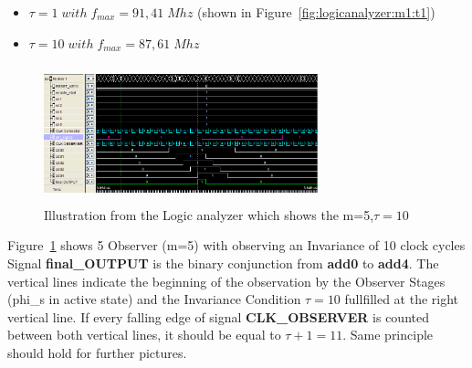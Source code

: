 \begin{itemize}
 \item $\tau = 1 \;with\; f_{max}=91,41\;Mhz$ (shown in Figure~\ref{fig:logicanalyzer:m1:t1})
 \item $\tau = 10 \;with\; f_{max}=87,61\;Mhz$ 
\end{itemize}

\begin{figure}[]
\centering
\includegraphics[width=300px,height=150px]{../../pictures/Logicanalyzer/5_Observer_Tau_10.png}
\caption[Logicanalyzer m=5,$\tau = 10$]{Illustration from the Logic analyzer which shows the m=5,$\tau = 10$}
\label{fig:logicanalyzer:m5:t10}
\end{figure}

Figure~\ref{fig:logicanalyzer:m5:t10} shows 5 Observer (m=5) with observing an Invariance of 10 clock cycles\\
Signal \textbf{final\_OUTPUT} is the binary conjunction from \textbf{add0} to \textbf{add4}. 
The vertical lines indicate the beginning of the observation by the Observer Stages (phi\_s in active state) and 
the Invariance Condition $\tau = 10$ fullfilled at the right vertical line. 
If every falling edge of signal \textbf{CLK\_OBSERVER} is counted
between both vertical lines, it should be equal to $\tau + 1 = 11$. 
Same principle should hold for further pictures. 


